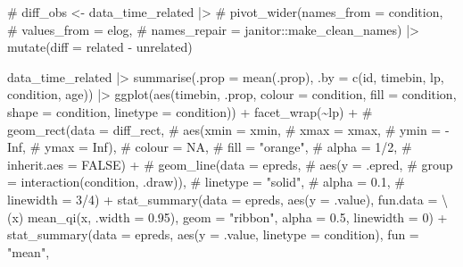 \documentclass[
  letterpaper,
  DIV=11,
  numbers=noendperiod]{scrartcl}
\newenvironment{Shaded}{\begin{snugshade}}{\end{snugshade}}
\newcommand{\AttributeTok}[1]{\textcolor[rgb]{0.40,0.45,0.13}{#1}}
\newcommand{\CommentTok}[1]{\textcolor[rgb]{0.37,0.37,0.37}{#1}}
\newcommand{\DecValTok}[1]{\textcolor[rgb]{0.68,0.00,0.00}{#1}}
\newcommand{\FloatTok}[1]{\textcolor[rgb]{0.68,0.00,0.00}{#1}}
\newcommand{\FunctionTok}[1]{\textcolor[rgb]{0.28,0.35,0.67}{#1}}
\newcommand{\NormalTok}[1]{\textcolor[rgb]{0.00,0.23,0.31}{#1}}
\newcommand{\SpecialCharTok}[1]{\textcolor[rgb]{0.37,0.37,0.37}{#1}}
\newcommand{\StringTok}[1]{\textcolor[rgb]{0.13,0.47,0.30}{#1}}
\begin{document}
\begin{Shaded}
\begin{Highlighting}[]
\CommentTok{\# diff\_obs \textless{}{-} data\_time\_related |\textgreater{}}
\CommentTok{\#   pivot\_wider(names\_from = condition, }
\CommentTok{\#               values\_from = elog,}
\CommentTok{\#               names\_repair = janitor::make\_clean\_names) |\textgreater{} mutate(diff = related {-} unrelated)}

\NormalTok{data\_time\_related }\SpecialCharTok{|\textgreater{}} 
    \FunctionTok{summarise}\NormalTok{(}\AttributeTok{.prop =} \FunctionTok{mean}\NormalTok{(.prop),}
              \AttributeTok{.by =} \FunctionTok{c}\NormalTok{(id, timebin, lp, condition, age)) }\SpecialCharTok{|\textgreater{}} 
    \FunctionTok{ggplot}\NormalTok{(}\FunctionTok{aes}\NormalTok{(timebin, .prop, }
               \AttributeTok{colour =}\NormalTok{ condition,}
               \AttributeTok{fill =}\NormalTok{ condition,}
               \AttributeTok{shape =}\NormalTok{ condition,}
               \AttributeTok{linetype =}\NormalTok{ condition)) }\SpecialCharTok{+}
    \FunctionTok{facet\_wrap}\NormalTok{(}\SpecialCharTok{\textasciitilde{}}\NormalTok{lp) }\SpecialCharTok{+}
    \CommentTok{\# geom\_rect(data = diff\_rect,}
    \CommentTok{\#         aes(xmin = xmin,}
    \CommentTok{\#           xmax = xmax,}
    \CommentTok{\#           ymin = {-}Inf,}
    \CommentTok{\#           ymax = Inf),}
    \CommentTok{\#         colour = NA,}
    \CommentTok{\#         fill = "orange",}
    \CommentTok{\#         alpha = 1/2,}
    \CommentTok{\#         inherit.aes = FALSE) +}
    \CommentTok{\# geom\_line(data = epreds,}
    \CommentTok{\#         aes(y = .epred,}
\CommentTok{\#           group = interaction(condition, .draw)),}
\CommentTok{\#         linetype = "solid",}
\CommentTok{\#         alpha = 0.1,}
\CommentTok{\#         linewidth = 3/4) +}
\FunctionTok{stat\_summary}\NormalTok{(}\AttributeTok{data =}\NormalTok{ epreds,}
             \FunctionTok{aes}\NormalTok{(}\AttributeTok{y =}\NormalTok{ .value),}
             \AttributeTok{fun.data =}\NormalTok{ \textbackslash{}(x) }\FunctionTok{mean\_qi}\NormalTok{(x, }\AttributeTok{.width =} \FloatTok{0.95}\NormalTok{),}
             \AttributeTok{geom =} \StringTok{"ribbon"}\NormalTok{,}
             \AttributeTok{alpha =} \FloatTok{0.5}\NormalTok{,}
             \AttributeTok{linewidth =} \DecValTok{0}\NormalTok{) }\SpecialCharTok{+}
    \FunctionTok{stat\_summary}\NormalTok{(}\AttributeTok{data =}\NormalTok{ epreds,}
                 \FunctionTok{aes}\NormalTok{(}\AttributeTok{y =}\NormalTok{ .value,}
                    \AttributeTok{linetype =}\NormalTok{ condition),}
                 \AttributeTok{fun =} \StringTok{"mean"}\NormalTok{,}

\end{Highlighting}
\end{Shaded}
\end{document}
